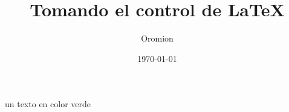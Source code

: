 \documentclass{article}
\title{Tomando el control de \LaTeX{}}
\author{Oromion}
\date{\today}
\begin{document}
\maketitle

\textcolor{myGreen}{un texto en color verde}
\end{document}
